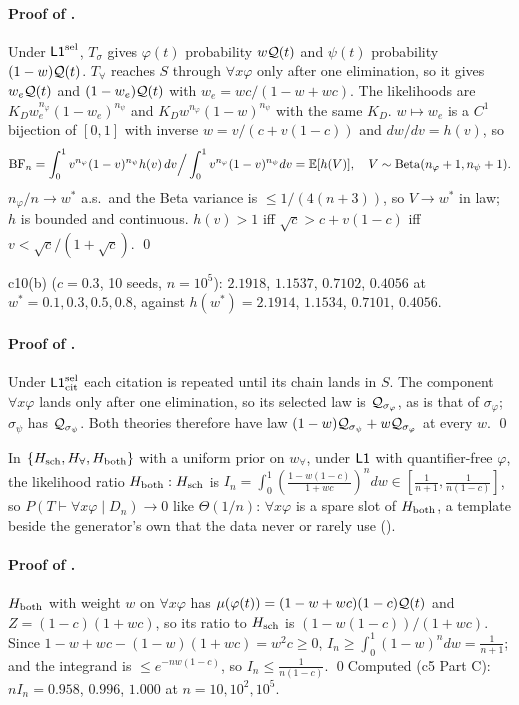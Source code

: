 \paragraph{Proof of .} Under $\mathord{\mathsf{L1}}^{\mathrm{sel}}$, $T_\sigma$ gives $\varphi(t)$ probability $w\mathcal{Q}(t)$ and $\psi(t)$ probability $(1-w)\mathcal{Q}(t)$. $T_\forall$ reaches $S$ through $\forall x\varphi$ only after one elimination, so it gives $w_e\mathcal{Q}(t)$ and $(1-w_e)\mathcal{Q}(t)$ with $w_e=wc/(1-w+wc)$. The likelihoods are $K_Dw_e^{n_\varphi}(1-w_e)^{n_\psi}$ and $K_Dw^{n_\varphi}(1-w)^{n_\psi}$ with the same $K_D$. $w\mapsto w_e$ is a $C^1$ bijection of $[0,1]$ with inverse $w=v/(c+v(1-c))$ and $dw/dv=h(v)$, so
\[\mathrm{BF}_n=\int_0^1v^{n_\varphi}(1-v)^{n_\psi}h(v)\,dv\Big/\int_0^1v^{n_\varphi}(1-v)^{n_\psi}dv=\mathbb{E}[h(V)],\quad V\sim\mathrm{Beta}(n_\varphi+1,n_\psi+1).\]
$n_\varphi/n\to w^*$ a.s.\ and the Beta variance is $\le1/(4(n+3))$, so $V\to w^*$ in law; $h$ is bounded and continuous. $h(v)>1$ iff $\sqrt c>c+v(1-c)$ iff $v<\sqrt c/(1+\sqrt c)$. \qed

c10(b) ($c=0.3$, 10 seeds, $n=10^5$): $2.1918$, $1.1537$, $0.7102$, $0.4056$ at $w^*=0.1,0.3,0.5,0.8$, against $h(w^*)=2.1914$, $1.1534$, $0.7101$, $0.4056$.

\paragraph{Proof of .} Under $\mathord{\mathsf{L1}}^{\mathrm{sel}}_{\mathrm{cit}}$ each citation is repeated until its chain lands in $S$. The component $\forall x\varphi$ lands only after one elimination, so its selected law is $\mathcal{Q}_{\sigma_\varphi}$, as is that of $\sigma_\varphi$; $\sigma_\psi$ has $\mathcal{Q}_{\sigma_\psi}$. Both theories therefore have law $(1-w)\mathcal{Q}_{\sigma_\psi}+w\mathcal{Q}_{\sigma_\varphi}$ at every $w$. \qed

\begin{proposition}\label{prop:univ:both}
In $\{H_{\mathrm{sch}},H_{\forall},H_{\mathrm{both}}\}$ with a uniform prior on $w_\forall$, under $\mathord{\mathsf{L1}}$ with quantifier-free $\varphi$, the likelihood ratio $H_{\mathrm{both}}:H_{\mathrm{sch}}$ is $I_n=\int_0^1(\frac{1-w(1-c)}{1+wc})^ndw\in[\frac1{n+1},\frac1{n(1-c)}]$, so $P(T\vdash\forall x\varphi\mid D_n)\to0$ like $\Theta(1/n)$: $\forall x\varphi$ is a spare slot of $H_{\mathrm{both}}$, a template beside the generator's own that the data never or rarely use ().
\end{proposition}

\paragraph{Proof of .} $H_{\mathrm{both}}$ with weight $w$ on $\forall x\varphi$ has $\mu(\varphi(t))=(1-w+wc)(1-c)\mathcal{Q}(t)$ and $Z=(1-c)(1+wc)$, so its ratio to $H_{\mathrm{sch}}$ is $(1-w(1-c))/(1+wc)$. Since $1-w+wc-(1-w)(1+wc)=w^2c\ge0$, $I_n\ge\int_0^1(1-w)^ndw=\frac1{n+1}$; and the integrand is $\le e^{-nw(1-c)}$, so $I_n\le\frac1{n(1-c)}$. \qed Computed (c5 Part C): $nI_n=0.958$, $0.996$, $1.000$ at $n=10,10^2,10^5$.


